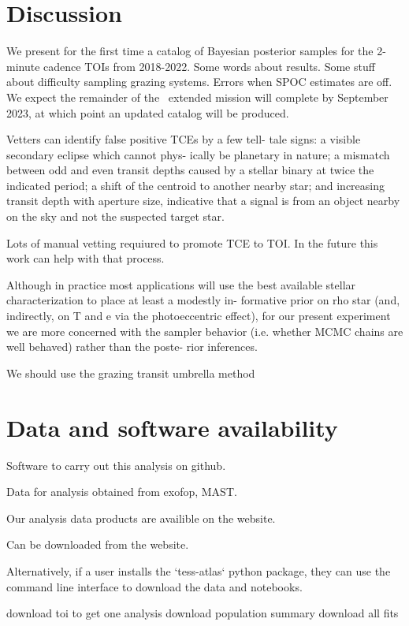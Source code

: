 \documentclass[floatfix,ApJL,twocolumn]{aastex631}
\begin{document}
\section{Discussion}\label{sec:conclusion}
We present for the first time a catalog of Bayesian posterior samples for the 2-minute cadence TOIs from 2018-2022.
Some words about results.
Some stuff about difficulty sampling grazing systems.
Errors when SPOC estimates are off.
We expect the remainder of the \tess\ extended mission will complete by September 2023, at which point an updated catalog will be produced.

Vetters can identify false positive TCEs by a few tell- tale signs: a visible secondary eclipse which cannot phys- ically be planetary in nature; a mismatch between odd and even transit depths caused by a stellar binary at twice the indicated period; a shift of the centroid to another nearby star; and increasing transit depth with aperture size, indicative that a signal is from an object nearby on the sky and not the suspected target star.

Lots of manual vetting requiured to promote TCE to TOI. In the future this work can help with that process.


Although in practice most applications will use the best available stellar characterization to place at least a modestly in- formative prior on rho star (and, indirectly, on T and e via the photoeccentric effect), for our present experiment we are more concerned with the sampler behavior (i.e. whether MCMC chains are well behaved) rather than the poste- rior inferences.

We should use the grazing transit umbrella method 


\section{Data and software availability}\label{sec:data}
Software to carry out this analysis on github.

Data for analysis obtained from exofop, MAST. 

Our analysis data products are availible on the website.

Can be downloaded from the website.

Alternatively, if a user installs the `tess-atlas` python package, they can use the command line interface to download the data and notebooks.

download toi to get one analysis
download population summary
download all fits
\end{document}
